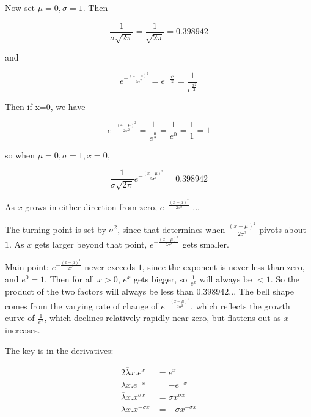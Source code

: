 \documentclass[reqno,12pt]{tufte-book}
\numberwithin{equation}{subsection}
\begin{document}
Now set $\mu=0, \sigma=1$.  Then

\begin{equation}
  \frac{1}{\sigma\sqrt{2\pi}} = \frac{1}{\sqrt{2\pi}} = 0.398942
\end{equation}

and

\begin{equation}
  e^{-\frac{(x-\mu)^2}{2\sigma^2}} =
  e^{-\frac{x^2}{2}} =
  \frac{1}{e^\frac{x^2}{2}}
\end{equation}

Then if x=0, we have

\begin{equation}
  e^{-\frac{(x-\mu)^2}{2\sigma^2}} =
  \frac{1}{e^\frac{0}{2}} =
  \frac{1}{e^0} = \frac{1}{1} = 1
\end{equation}

so when $\mu=0, \sigma=1, x=0$,

\begin{equation}
  \frac{1}{\sigma\sqrt{2\pi}}e^{-\frac{(x-\mu)^2}{2\sigma^2}} = 0.398942
\end{equation}

As $x$ grows in either direction from zero, $e^{-\frac{(x-\mu)^2}{2\sigma^2}}$ ...

The turning point is set by $\sigma^2$, since that determines when
$\frac{(x-\mu)^2}{2\sigma^2}$ pivots about $1$.  As $x$ gets larger beyond that point,
$e^{-\frac{(x-\mu)^2}{2\sigma^2}}$ gets smaller.

Main point: $e^{-\frac{(x-\mu)^2}{2\sigma^2}}$ never exceeds $1$,
since the exponent is never less than zero, and $e^0=1$. Then for all
$x>0$, $e^x$ gets bigger, so $\frac{1}{e^x}$ will always be $<1$.  So
the product of the two factors will always be less than $0.398942...$
The bell shape comes from the varying rate of change of
$e^{-\frac{(x-\mu)^2}{2\sigma^2}}$, which reflects the growth curve of
$\frac{1}{e^x}$, which declines relatively rapidly near zero, but
flattens out as $x$ increases.

The key is in the derivatives:

{
  \begin{alignat}{2}
  \overline{\lambda}x.{e^{x}} &= e^{x} \\
  \overline{\lambda}x.{e^{-x}} &= -e^{-x} \\
  \overline{\lambda}x.x^{\sigma x} &= \sigma x^{\sigma x} \\
  \overline{\lambda}x.x^{-\sigma x} &= -\sigma x^{-\sigma x}
  \end{alignat}
}
\end{document}
